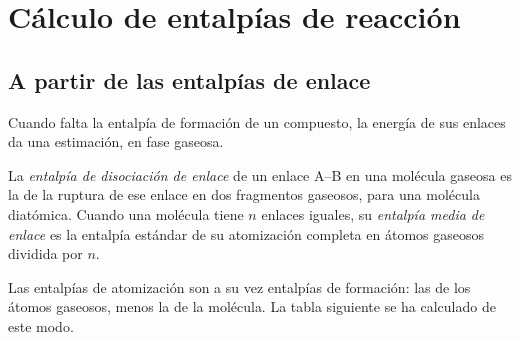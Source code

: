 \section{Cálculo de entalpías de reacción}

\subsection*{A partir de las entalpías de enlace}

Cuando falta la entalpía de formación de un compuesto, la energía de sus
enlaces da una estimación, en fase gaseosa.

\begin{definition}\label{def:b2:reaction-enthalpy:bond-enthalpy}
La \emph{entalpía de disociación de enlace} de
un enlace A--B en una molécula gaseosa es la  de la
ruptura de ese enlace en dos fragmentos gaseosos, 
para una molécula diatómica. Cuando una molécula tiene $n$ enlaces iguales, su
\emph{entalpía media de enlace} es la entalpía
estándar de su atomización completa en átomos gaseosos dividida por $n$.
\end{definition}

Las entalpías de atomización son a su vez entalpías de formación: las de
los átomos gaseosos, menos la de la molécula. La tabla siguiente se ha
calculado de este modo.

